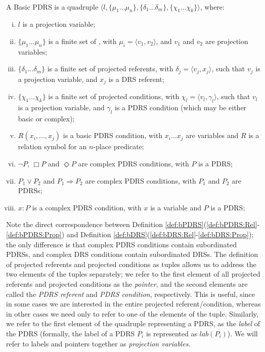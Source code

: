 \begin{definition} \label{def:bPDRS}~\\
A Basic PDRS is a quadruple $\langle l, \{\mu_1 ... \mu_n\}, 
\{\delta_1 ... \delta_m\}, \{\chi_1 ... \chi_k\}\rangle$, where:
  \begin{enumerate}[i.]
    \item $l$ is a projection variable;
    \item $\{\mu_1 ... \mu_n\}$ is a finite set of \MAPs, with $\mu_i=\langle
      v_1,v_2\rangle$, and  $v_1$ and $v_2$ are projection variables;
    \item $\{\delta_1 ... \delta_m\}$ is a finite set of projected
      referents, with $\delta_j=\langle v_j, x_j\rangle$, such that $v_j$ is
      a projection variable, and $x_j$ is a DRS referent;
    \item $\{\chi_1 ... \chi_k\}$ is a finite set of projected conditions,
      with $\chi_l = \langle v_l,\gamma_l\rangle$, such that $v_l$ is a
      projection variable, and $\gamma_l$ is a PDRS condition (which may be
      either basic or complex);
    \item \label{def:bPDRS:Rel} $R(x_i, ..., x_j)$ is a basic PDRS condition,
      with $x_i ... x_j$ are variables and $R$ is a relation symbol for an
      $n$-place predicate;
    \item $\neg P$, $\Box P$ and $\Diamond P$ are complex PDRS conditions,
      with $P$ is a PDRS;
    \item $P_1 \vee P_2$ and $P_1 \Rightarrow P_2$ are complex PDRS
      conditions, with $P_1$ and $P_2$ are PDRSs;
    \item\label{def:bPDRS:Prop} $x:P$ is a complex PDRS condition, with $x$
      is a variable and $P$ is a PDRS;
  \end{enumerate}
\end{definition}

\noindent Note the direct correspondence between Definition
\ref{def:bPDRS}(\ref{def:bPDRS:Rel}-\ref{def:bPDRS:Prop}) and Definition
\ref{def:bDRS}(\ref{def:bDRS:Rel}-\ref{def:bDRS:Prop}); the only difference
is that complex PDRS conditions contain subordinated PDRSs, and complex DRS
conditions contain subordinated DRSs.  The definition of projected referents
and projected conditions as tuples allows us to address the two elements
of the tuples separately; we refer to the first element of all projected
referents and projected conditions as the \textit{pointer}, and the second
elements are called the \textit{PDRS referent} and \textit{PDRS condition},
respectively. This is useful, since in some cases we are interested in the
entire projected referent/condition, whereas in other cases we need only to
refer to one of the elements of the tuple. Similarly, we refer to the first
element of the quadruple representing a PDRS, as the \textit{label} of the
PDRS (formally, the label of a PDRS $P_i$ is represented as $lab(P_i)$).
We will refer to labels and pointers together as \textit{projection
variables}.

